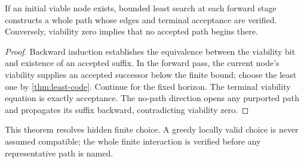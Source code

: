 \begin{theorem}
If an initial viable node exists, bounded least search at each forward stage
constructs a whole path whose edges and terminal acceptance are verified.
Conversely, viability zero implies that no accepted path begins there.
\end{theorem}

\begin{proof}
Backward induction establishes the equivalence between the viability bit and
existence of an accepted suffix.  In the forward pass, the current node's
viability supplies an accepted successor below the finite bound; choose the
least one by \cref{thm:least-code}.  Continue for the fixed horizon.  The
terminal viability equation is exactly acceptance.  The no-path direction
opens any purported path and propagates its suffix backward, contradicting
viability zero.
\end{proof}

This theorem resolves hidden finite choice.  A greedy locally valid choice is
never assumed compatible; the whole finite interaction is verified before any
representative path is named.
